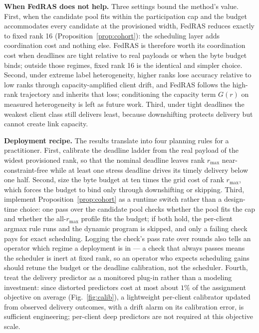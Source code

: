 \documentclass[a4paper,fleqn]{cas-dc}
\begin{document}
\textbf{When FedRAS does not help.} Three settings bound the method's value. First, when the candidate pool fits within the participation cap and the budget accommodates every candidate at the provisioned width, FedRAS reduces exactly to fixed rank 16 (Proposition~\ref{prop:cohort}): the scheduling layer adds coordination cost and nothing else. FedRAS is therefore worth its coordination cost when deadlines are tight relative to real payloads or when the byte budget binds; outside those regimes, fixed rank 16 is the identical and simpler choice. Second, under extreme label heterogeneity, higher ranks lose accuracy relative to low ranks through capacity-amplified client drift, and FedRAS follows the high-rank trajectory and inherits that loss; conditioning the capacity term $G(r)$ on measured heterogeneity is left as future work. Third, under tight deadlines the weakest client class still delivers least, because downshifting protects delivery but cannot create link capacity.

\textbf{Deployment recipe.} The results translate into four planning rules for a practitioner. First, calibrate the deadline ladder from the real payload of the widest provisioned rank, so that the nominal deadline leaves rank $r_{\max}$ near-constraint-free while at least one stress deadline drives its timely delivery below one half. Second, size the byte budget at ten times the grid cost of rank $r_{\max}$, which forces the budget to bind only through downshifting or skipping. Third, implement Proposition~\ref{prop:cohort} as a runtime switch rather than a design-time choice: one pass over the candidate pool checks whether the pool fits the cap and whether the all-$r_{\max}$ profile fits the budget; if both hold, the per-client argmax rule runs and the dynamic program is skipped, and only a failing check pays for exact scheduling. Logging the check's pass rate over rounds also tells an operator which regime a deployment is in --- a check that always passes means the scheduler is inert at fixed rank, so an operator who expects scheduling gains should retune the budget or the deadline calibration, not the scheduler. Fourth, treat the delivery predictor as a monitored plug-in rather than a modeling investment: since distorted predictors cost at most about $1\%$ of the assignment objective on average (Fig.~\ref{fig:calib}), a lightweight per-client calibrator updated from observed delivery outcomes, with a drift alarm on its calibration error, is sufficient engineering; per-client deep predictors are not required at this objective scale.
\end{document}

